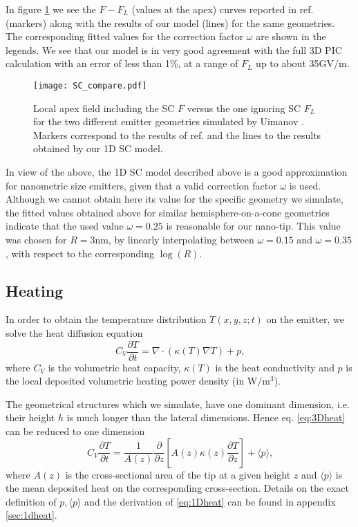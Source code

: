 \documentclass[%
 aps,
 prb,%
 amsmath,amssymb,
reprint,%
superscriptaddress,
]{revtex4-1}
\begin{document}
In figure \ref{fig:SCcomp} we see the $F-F_L$ (values at the apex) curves reported in ref. \cite{Uimanov2011} (markers) along with the results of our model (lines) for the same geometries.
The corresponding fitted values for the correction factor $\omega$ are shown in the legends.
We see that our model is in very good agreement with the full 3D PIC calculation with an error of less than 1\%, at a range of $F_L$ up to about 35GV/m. 

\begin{figure}[htbp]
	\centering
    \texttt{[image: SC\_compare.pdf]}
    \caption{Local apex field including the SC $F$ versus the one ignoring SC $F_L$ for the two different emitter geometries simulated by Uimanov \cite{Uimanov2011}. Markers correspond to the results of ref. \cite{Uimanov2011} and the lines to the results obtained by our 1D SC model.}    \label{fig:SCcomp}
\end{figure} 

In view of the above, the 1D SC model described above is a good approximation for nanometric size emitters, given that a valid correction factor $\omega$ is used.
Although we cannot obtain here its value for the specific geometry we simulate, the fitted values obtained above for similar hemisphere-on-a-cone geometries indicate that the used value $\omega = 0.25$ is reasonable for our nano-tip.
This value was chosen for $R=3$nm, by linearly interpolating between $\omega=0.15$ and $\omega = 0.35$, with respect to the corresponding $\log(R)$.

\subsection{Heating} \label{ssec:heat}

In order to obtain the temperature distribution $T(x,y,z;t)$ on the emitter, we solve the heat diffusion equation \cite{bejan2003heat}
\begin{equation}
	\label{eq:3Dheat}
	C_V \frac{\partial T}{\partial t} = \nabla \cdot \left(\kappa(T) \nabla T \right)+ p \textrm{,}
\end{equation}
where $C_V$ is the volumetric heat capacity, $\kappa(T)$ is the heat conductivity and $p$ is the local deposited volumetric heating power density (in $\textrm{W}/\textrm{m}^3$). 

The geometrical structures which we simulate, have one dominant dimension, i.e. their height $h$ is much longer than the lateral dimensions.
Hence eq. \eqref{eq:3Dheat} can be reduced to one dimension
 \begin{equation}
        \label{eq:1Dheat}
        C_V \frac{\partial T}{\partial t} = \frac{1}{A(z)} \frac{\partial}{\partial z} \left[ A(z) \kappa(z) \frac{\partial T}{\partial z} \right]  + \langle p \rangle \textrm{,}
 \end{equation}
where $A(z)$ is the cross-sectional area of the tip at a given height $z$ and $\langle p \rangle$ is the mean deposited heat on the corresponding cross-section. 
Details on the exact definition of $p, \langle p \rangle$ and the derivation of \eqref{eq:1Dheat} can be found in appendix \ref{sec:1dheat}.
\end{document}
